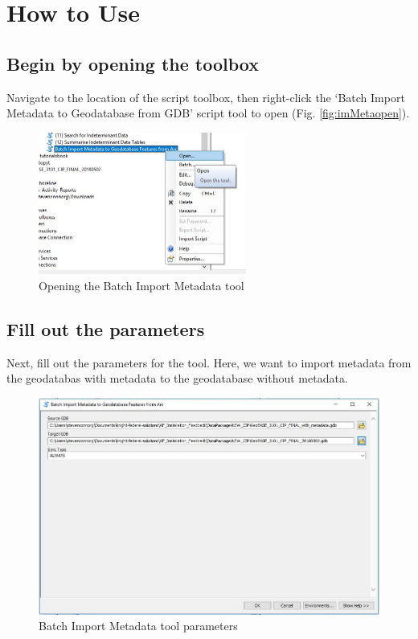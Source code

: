 \documentclass[openany]{book}
\theoremstyle{definition}
\theoremstyle{definition}
\theoremstyle{definition}
\theoremstyle{remark}
\begin{document}
\section{How to Use}\label{how-to-use-12}

\subsection{Begin by opening the
toolbox}\label{begin-by-opening-the-toolbox-12}

Navigate to the location of the script toolbox, then right-click the
`Batch Import Metadata to Geodatabase from GDB' script tool to open
(Fig. \ref{fig:imMetaopen}).

\begin{figure}[H]

{\centering \includegraphics[width=2.69in,]{figures/imMetaArc-open} 

}

\caption{Opening the Batch Import Metadata tool}\label{fig:imMetaArcopen}
\end{figure}

\subsection{Fill out the parameters}\label{fill-out-the-parameters-12}

Next, fill out the parameters for the tool. Here, we want to import
metadata from the geodatabas with metadata to the geodatabase without
metadata.

\begin{figure}[H]

{\centering \includegraphics[width=4.79in,]{figures/imMetaArc-params} 

}

\caption{Batch Import Metadata tool parameters}\label{fig:imMetaArcparams}
\end{figure}
\end{document}
